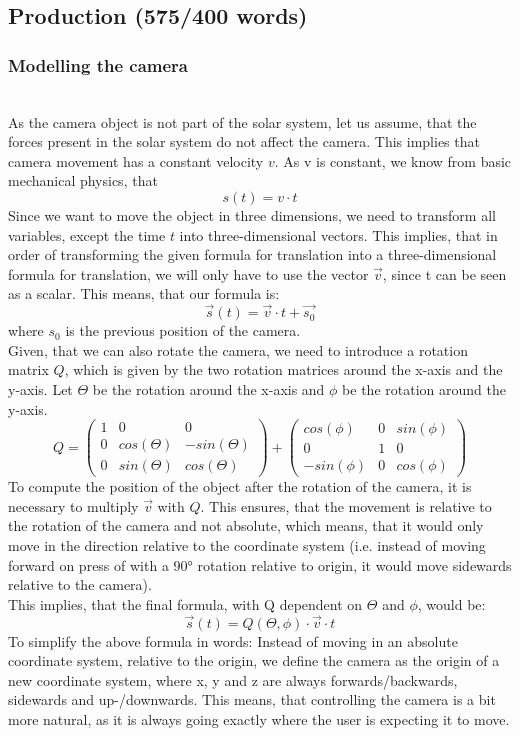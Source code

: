 \documentclass[conference,compsoc]{IEEEtran}
\begin{document}
\subsection{Production (575/400 words)}
\subsubsection{Modelling the camera} \hfill \\
As the camera object is not part of the solar system, let us assume, that the forces present in the solar system do not affect the camera. This implies that camera movement has a constant velocity $v$. As v is constant, we know from basic mechanical physics, that $$s(t) = v \cdot t$$ Since we want to move the object in three dimensions, we need to transform all variables, except the time $t$ into three-dimensional vectors. This implies, that in order of transforming the given formula for translation into a three-dimensional formula for translation, we will only have to use the vector $\vec{v}$, since t can be seen as a scalar. This means, that our formula is:
$$\vec{s}(t) = \vec{v} \cdot t + \vec{s_{0}}$$
where $s_{0}$ is the previous position of the camera.\\
Given, that we can also rotate the camera, we need to introduce a rotation matrix $Q$, which is given by the two rotation matrices around the x-axis and the y-axis.
Let $\Theta$ be the rotation around the x-axis and $\phi$ be the rotation around the y-axis.
$$ Q = \begin{pmatrix}
	1 & 0 & 0 \\
	0 & cos(\Theta) & -sin(\Theta)\\
	0 & sin(\Theta) & cos(\Theta)
\end{pmatrix}+\begin{pmatrix}
	cos(\phi) & 0 & sin(\phi) \\
	0 & 1 & 0 \\
	-sin(\phi) & 0 & cos(\phi)
\end{pmatrix} $$
To compute the position of the object after the rotation of the camera, it is necessary to multiply $\vec{v}$ with $Q$. This ensures, that the movement is relative to the rotation of the camera and not absolute, which means, that it would only move in the direction relative to the coordinate system (i.e. instead of moving forward on press of  with a 90° rotation relative to origin, it would move sidewards relative to the camera).\\
This implies, that the final formula, with Q dependent on $\Theta$ and $\phi$, would be: $$
\vec{s}(t) = Q(\Theta, \phi) \cdot \vec{v} \cdot t$$
\label{CamMov}
To simplify the above formula in words: Instead of moving in an absolute coordinate system, relative to the origin, we define the camera as the origin of a new coordinate system, where x, y and z are always forwards/backwards, sidewards and up-/downwards. This means, that controlling the camera is a bit more natural, as it is always going exactly where the user is expecting it to move.
\end{document}
